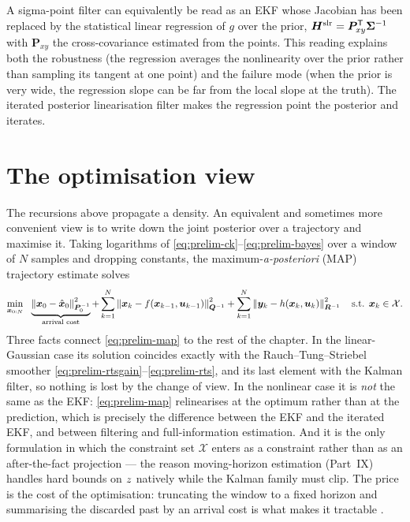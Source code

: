 \begin{remark}\label{rem:prelim-statlin}
A sigma-point filter can equivalently be read as an EKF whose Jacobian has been replaced by the
statistical linear regression of $g$ over the prior, $\bm{H}^{\mathrm{slr}} =
\bm{P}_{xy}^{\mathsf{T}}\bm\Sigma^{-1}$ with $\bm{P}_{xy}$ the cross-covariance estimated from the points.
This reading explains both the robustness (the regression averages the nonlinearity over the
prior rather than sampling its tangent at one point) and the failure mode (when the prior is
very wide, the regression slope can be far from the local slope at the truth). The iterated
posterior linearisation filter makes the regression point the posterior and iterates.
\end{remark}

\section{The optimisation view}
\label{sec:prelim-map}

The recursions above propagate a density. An equivalent and sometimes more convenient view is to
write down the joint posterior over a trajectory and maximise it. Taking logarithms of
\eqref{eq:prelim-ck}--\eqref{eq:prelim-bayes} over a window of $N$ samples and dropping constants,
the maximum-\emph{a-posteriori} (MAP) trajectory estimate solves
\begin{equation}
\min_{\bm{x}_{0:N}}\ \
\underbrace{\left\lVert \bm{x}_0 - \hat{\bm{x}}_0 \right\rVert^2_{\bm{P}_0^{-1}}}_{\text{arrival cost}}
+ \sum_{k=1}^{N}\left\lVert \bm{x}_k - f(\bm{x}_{k-1},\bm{u}_{k-1}) \right\rVert^2_{\bm{Q}^{-1}}
+ \sum_{k=1}^{N}\left\lVert \bm{y}_k - h(\bm{x}_k,\bm{u}_k) \right\rVert^2_{\bm{R}^{-1}}
\quad \text{s.t. } \bm{x}_k\in\mathcal{X}.
\label{eq:prelim-map}
\end{equation}
Three facts connect \eqref{eq:prelim-map} to the rest of the chapter. In the linear-Gaussian case
its solution coincides exactly with the Rauch--Tung--Striebel smoother
\eqref{eq:prelim-rtsgain}--\eqref{eq:prelim-rts}, and its last element with the Kalman filter, so
nothing is lost by the change of view. In the nonlinear case it is \emph{not} the same as the
EKF: \eqref{eq:prelim-map} relinearises at the optimum rather than at the prediction, which is
precisely the difference between the EKF and the iterated EKF, and between filtering and
full-information estimation. And it is the only formulation in which the constraint set
$\mathcal{X}$ enters as a constraint rather than as an after-the-fact projection --- the reason
moving-horizon estimation (Part~IX) handles hard bounds on $z$ natively while the Kalman family
must clip. The price is the cost of the optimisation: truncating the window to a fixed horizon
and summarising the discarded past by an arrival cost is what makes it tractable
\cite{rao2003mhe,rawlings2017mpc}.

